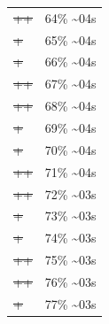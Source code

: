 \documentclass[12pt]{article}
\begin{document}
\begin{center}
\begin{tabular}{ll}
\sout{\sout{\sout{\sout{\sout{\sout{\sout{\sout{\sout{\sout{\sout{\sout{\sout{\sout{\sout{++}}}}}}}}}}}}}}} & 64\% \textasciitilde{}04s\\
\sout{\sout{\sout{\sout{\sout{\sout{\sout{\sout{\sout{\sout{\sout{\sout{\sout{\sout{\sout{\sout{+}}}}}}}}}}}}}}}} & 65\% \textasciitilde{}04s\\
\sout{\sout{\sout{\sout{\sout{\sout{\sout{\sout{\sout{\sout{\sout{\sout{\sout{\sout{\sout{\sout{+}}}}}}}}}}}}}}}} & 66\% \textasciitilde{}04s\\
\sout{\sout{\sout{\sout{\sout{\sout{\sout{\sout{\sout{\sout{\sout{\sout{\sout{\sout{\sout{\sout{++}}}}}}}}}}}}}}}} & 67\% \textasciitilde{}04s\\
\sout{\sout{\sout{\sout{\sout{\sout{\sout{\sout{\sout{\sout{\sout{\sout{\sout{\sout{\sout{\sout{++}}}}}}}}}}}}}}}} & 68\% \textasciitilde{}04s\\
\sout{\sout{\sout{\sout{\sout{\sout{\sout{\sout{\sout{\sout{\sout{\sout{\sout{\sout{\sout{\sout{\sout{+}}}}}}}}}}}}}}}}} & 69\% \textasciitilde{}04s\\
\sout{\sout{\sout{\sout{\sout{\sout{\sout{\sout{\sout{\sout{\sout{\sout{\sout{\sout{\sout{\sout{\sout{+}}}}}}}}}}}}}}}}} & 70\% \textasciitilde{}04s\\
\sout{\sout{\sout{\sout{\sout{\sout{\sout{\sout{\sout{\sout{\sout{\sout{\sout{\sout{\sout{\sout{\sout{++}}}}}}}}}}}}}}}}} & 71\% \textasciitilde{}04s\\
\sout{\sout{\sout{\sout{\sout{\sout{\sout{\sout{\sout{\sout{\sout{\sout{\sout{\sout{\sout{\sout{\sout{++}}}}}}}}}}}}}}}}} & 72\% \textasciitilde{}03s\\
\sout{\sout{\sout{\sout{\sout{\sout{\sout{\sout{\sout{\sout{\sout{\sout{\sout{\sout{\sout{\sout{\sout{\sout{+}}}}}}}}}}}}}}}}}} & 73\% \textasciitilde{}03s\\
\sout{\sout{\sout{\sout{\sout{\sout{\sout{\sout{\sout{\sout{\sout{\sout{\sout{\sout{\sout{\sout{\sout{\sout{+}}}}}}}}}}}}}}}}}} & 74\% \textasciitilde{}03s\\
\sout{\sout{\sout{\sout{\sout{\sout{\sout{\sout{\sout{\sout{\sout{\sout{\sout{\sout{\sout{\sout{\sout{\sout{++}}}}}}}}}}}}}}}}}} & 75\% \textasciitilde{}03s\\
\sout{\sout{\sout{\sout{\sout{\sout{\sout{\sout{\sout{\sout{\sout{\sout{\sout{\sout{\sout{\sout{\sout{\sout{++}}}}}}}}}}}}}}}}}} & 76\% \textasciitilde{}03s\\
\sout{\sout{\sout{\sout{\sout{\sout{\sout{\sout{\sout{\sout{\sout{\sout{\sout{\sout{\sout{\sout{\sout{\sout{\sout{+}}}}}}}}}}}}}}}}}}} & 77\% \textasciitilde{}03s\\

\end{tabular}
\end{center}
\end{document}
